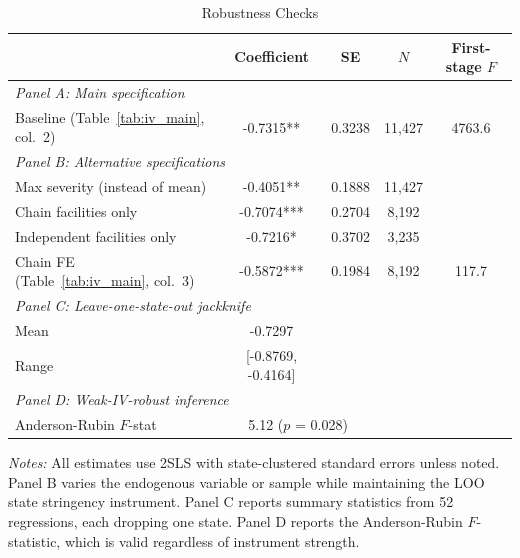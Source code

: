 \begin{table}[H]
\centering
\caption{Robustness Checks}
\label{tab:robustness}
\begin{threeparttable}
\begin{tabular}{lcccc}
\toprule
& Coefficient & SE & $N$ & First-stage $F$ \\
\midrule
\multicolumn{5}{l}{\textit{Panel A: Main specification}} \\[3pt]
Baseline (Table~\ref{tab:iv_main}, col.~2) & -0.7315** & 0.3238 & 11,427 & 4763.6 \\[6pt]
\multicolumn{5}{l}{\textit{Panel B: Alternative specifications}} \\[3pt]
Max severity (instead of mean) & -0.4051** & 0.1888 & 11,427 & & \\
Chain facilities only & -0.7074*** & 0.2704 & 8,192 & & \\
Independent facilities only & -0.7216* & 0.3702 & 3,235 & & \\
Chain FE (Table~\ref{tab:iv_main}, col.~3) & -0.5872*** & 0.1984 & 8,192 & 117.7 \\[6pt]
\multicolumn{5}{l}{\textit{Panel C: Leave-one-state-out jackknife}} \\[3pt]
Mean & -0.7297 & & & \\
Range & [-0.8769, -0.4164] & & & \\[6pt]
\multicolumn{5}{l}{\textit{Panel D: Weak-IV-robust inference}} \\[3pt]
Anderson-Rubin $F$-stat & \multicolumn{2}{c}{5.12 ($p$ = 0.028)} & & \\
\bottomrule
\end{tabular}
\begin{tablenotes}[flushleft]
\small
\item \textit{Notes:} All estimates use 2SLS with state-clustered standard errors unless noted.
Panel B varies the endogenous variable or sample while maintaining the LOO state
stringency instrument. Panel C reports summary statistics from 52 regressions,
each dropping one state. Panel D reports the Anderson-Rubin $F$-statistic, which is valid
regardless of instrument strength.
\end{tablenotes}
\end{threeparttable}
\end{table}
